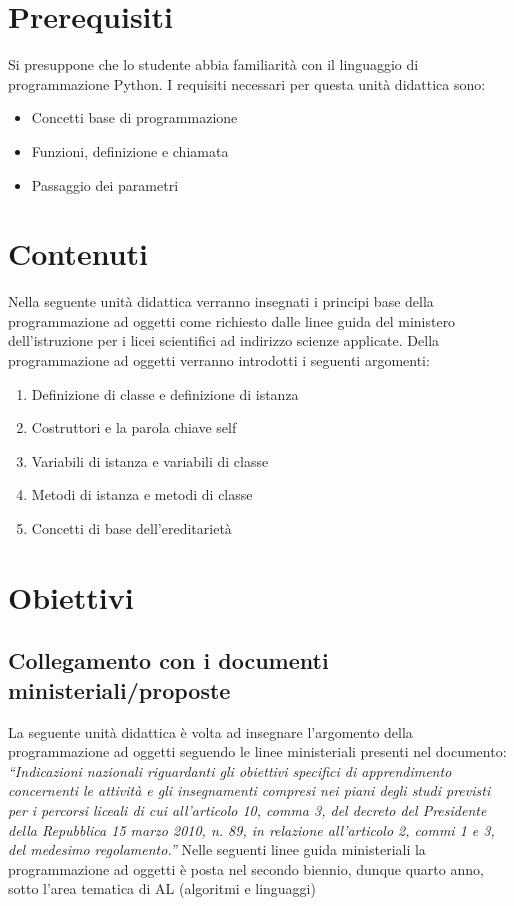 \documentclass[12pt,a4paper]{article}
\begin{document}
\section{Prerequisiti}\label{prerequisiti}

Si presuppone che lo studente abbia familiarità con il linguaggio di programmazione Python.
I requisiti necessari per questa unità didattica sono:
\begin{itemize}
    \item Concetti base di programmazione
    \item Funzioni, definizione e chiamata
    \item Passaggio dei parametri 
\end{itemize}


\section{Contenuti}\label{contenuti}

Nella seguente unità didattica verranno insegnati i principi base della programmazione ad oggetti come richiesto dalle linee guida del ministero dell’istruzione per i licei scientifici ad indirizzo scienze applicate. 
Della programmazione ad oggetti verranno introdotti i seguenti argomenti: 
\begin{enumerate}
    \item Definizione di classe e definizione di istanza
    \item Costruttori e la parola chiave self
    \item Variabili di istanza e variabili di classe
    \item Metodi di istanza e metodi di classe
    \item Concetti di base dell'ereditarietà 
\end{enumerate}


\section{Obiettivi}\label{obiettivi}






\subsection{Collegamento con i documenti
ministeriali/proposte}\label{collegamento-con-i-documenti-ministerialiproposte}

La seguente unità didattica è volta ad insegnare l’argomento della programmazione ad oggetti seguendo le linee ministeriali presenti nel documento: \textit{“Indicazioni nazionali riguardanti gli obiettivi specifici di apprendimento concernenti le attività e gli insegnamenti compresi nei piani degli studi previsti per i percorsi liceali di cui all’articolo 10, comma 3, del decreto del Presidente della Repubblica 15 marzo 2010, n. 89, in relazione all’articolo 2, commi 1 e 3, del medesimo regolamento.”} Nelle seguenti linee guida ministeriali la programmazione ad oggetti è posta nel secondo biennio, dunque quarto anno, sotto l’area tematica di AL (algoritmi e linguaggi)
\end{document}
